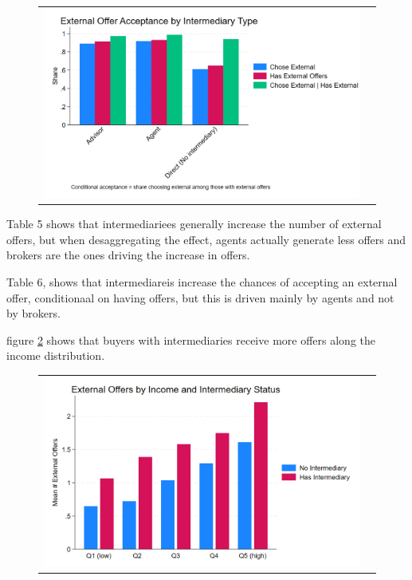 \documentclass[12pt]{article}
\begin{document}
\begin{figure}[H]
\caption{}
 \label{fig:ie4_10}
\centering{}%
\begin{tabular}{cc}
\includegraphics[scale=0.17]{../figures/IE4/IE4_external_acceptance_by_intermediary.png} 
\end{tabular}
\end{figure} 
 
Table 5 shows that intermediariees generally increase the number of external offers, but when desaggregating the effect, agents actually generate less offers and brokers are the ones driving the increase in offers. 
 

 Table 6, shows that intermediareis increase the chances of accepting an external offer,  conditionaal on having offers, but this is driven mainly by agents and not by brokers.

  
figure \ref{fig:ie4_11} shows that buyers with intermediaries receive more offers along the income distribution. 
  \begin{figure}[H]
\caption{}
 \label{fig:ie4_11}
\centering{}%
\begin{tabular}{cc}
\includegraphics[scale=0.27]{../figures/IE4/IE4_external_by_income_intermediary.png} 
\end{tabular}
\end{figure} 
\end{document}
